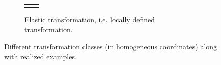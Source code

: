 \begin{figure}
\begin{subfigure}{\linewidth}
\begin{tabular}{>{\centering}p{4cm}c}
{{				}
			}
			\)
		\end{tabular}
		\caption{Elastic transformation, i.e. locally defined transformation.} \label{fig:elastictransformation}
	\end{subfigure}
	\caption[Compact Routing Example]{Different transformation classes (in homogeneous coordinates) along with realized examples.}
	\label{fig:transformations}
\end{figure}
